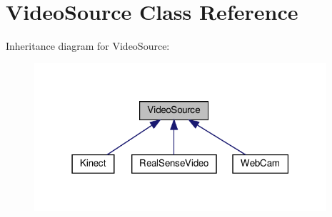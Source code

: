 \section{Video\+Source Class Reference}
\label{class_video_source}


Inheritance diagram for Video\+Source\+:
\nopagebreak
\begin{figure}[H]
\begin{center}
\leavevmode
\includegraphics[width=307pt]{class_video_source__inherit__graph}
\end{center}
\end{figure}

